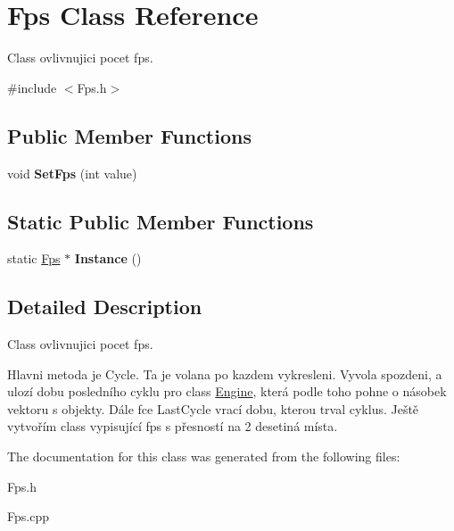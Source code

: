 \hypertarget{class_fps}{\section{Fps Class Reference}
\label{class_fps}
}


Class ovlivnujici pocet fps.  




{\ttfamily \#include $<$Fps.\-h$>$}

\subsection*{Public Member Functions}
\begin{DoxyCompactItemize}
\item 
\hypertarget{class_fps_adbacf88afdbec9db3fb7942f11d90eee}{void {\bfseries Set\-Fps} (int value)}\label{class_fps_adbacf88afdbec9db3fb7942f11d90eee}

\end{DoxyCompactItemize}
\subsection*{Static Public Member Functions}
\begin{DoxyCompactItemize}
\item 
\hypertarget{class_fps_a732cf27c65d37cd4823b8cbe105e97aa}{static \hyperlink{class_fps}{Fps} $\ast$ {\bfseries Instance} ()}\label{class_fps_a732cf27c65d37cd4823b8cbe105e97aa}

\end{DoxyCompactItemize}


\subsection{Detailed Description}
Class ovlivnujici pocet fps. 

Hlavni metoda je Cycle. Ta je volana po kazdem vykresleni. Vyvola spozdeni, a ulozí dobu posledního cyklu pro class \hyperlink{class_engine}{Engine}, která podle toho pohne o násobek vektoru s objekty. Dále fce Last\-Cycle vrací dobu, kterou trval cyklus. Ještě vytvořím class vypisující fps s přesností na 2 desetiná místa. 

The documentation for this class was generated from the following files\-:\begin{DoxyCompactItemize}
\item 
Fps.\-h\item 
Fps.\-cpp\end{DoxyCompactItemize}
